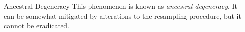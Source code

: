 \documentclass[final, 12pt]{beamer}
\newlength{\colwidth}
\begin{document}
\begin{frame}
\begin{columns}
\begin{column}{\colwidth}
\begin{block}{Ancestral Degeneracy}
This phenomenon is known as \emph{ancestral degeneracy}. It can be somewhat mitigated by alterations to the resampling procedure, but it cannot be eradicated.

\end{block}
\end{column}

\begin{column}{\colwidth}
\begin{block}

\end{block}
\end{column}
\end{columns}

\end{frame}
\end{document}
